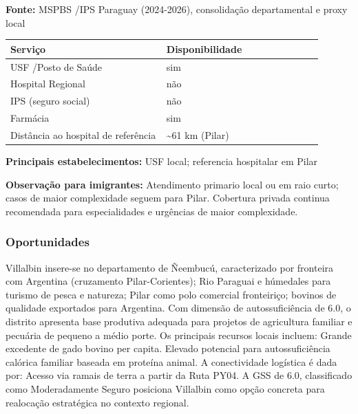 \textbf{Fonte:} MSPBS /\allowbreak  IPS Paraguay (2024-2026), consolidação
departamental e proxy local

{\def\LTcaptype{none} %
\begin{longtable}{@{}>{\raggedright\arraybackslash}p{0.45\linewidth} >{\raggedright\arraybackslash}p{0.45\linewidth}@{}}
\toprule\noalign{}
Serviço & Disponibilidade \\
\midrule\noalign{}
\endhead
\bottomrule\noalign{}
\endlastfoot
USF /\allowbreak  Posto de Saúde & sim \\
Hospital Regional & não \\
IPS (seguro social) & não \\
Farmácia & sim \\
Distância ao hospital de referência & \textasciitilde61 km (Pilar) \\
\end{longtable}
}

\textbf{Principais estabelecimentos:} USF local; referencia hospitalar
em Pilar

\textbf{Observação para imigrantes:} Atendimento primario local ou em
raio curto; casos de maior complexidade seguem para Pilar. Cobertura
privada continua recomendada para especialidades e urgências de maior
complexidade.

\subsubsection*{Oportunidades}\label{oport-villalbin-1216}
Villalbin insere-se no departamento de Ñeembucú, caracterizado por fronteira com Argentina (cruzamento Pilar-Corientes); Rio Paraguai e húmedales para turismo de pesca e natureza; Pilar como polo comercial fronteiriço; bovinos de qualidade exportados para Argentina. Com dimensão de autossuficiência de 6.0, o distrito apresenta base produtiva adequada para projetos de agricultura familiar e pecuária de pequeno a médio porte. Os principais recursos locais incluem: Grande excedente de gado bovino per capita. Elevado potencial para autossuficiência calórica familiar baseada em proteína animal. A conectividade logística é dada por: Acesso via ramais de terra a partir da Ruta PY04. A GSS de 6.0, classificado como Moderadamente Seguro posiciona Villalbin como opção concreta para realocação estratégica no contexto regional.


